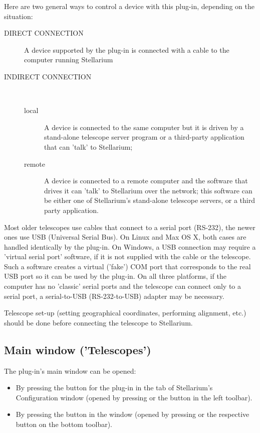 Here are two general ways to control a device with this plug-in, depending on the situation:
\begin{description}
\item[DIRECT CONNECTION] A device supported by the plug-in is
  connected with a cable to the computer running Stellarium

\item[INDIRECT CONNECTION]\mbox{\ } %
  \begin{description}
  \item[local] A device is connected to the same computer but it is
    driven by a stand-alone telescope server program or a third-party
    application that can 'talk' to Stellarium;

  \item[remote] A device is connected to a remote computer and the
    software that drives it can 'talk' to Stellarium over the network;
    this software can be either one of Stellarium's stand-alone
    telescope servers, or a third party application.
  \end{description}
\end{description}
Most older telescopes use cables that connect to a serial port
(RS-232), the newer ones use USB (Universal Serial Bus). On Linux and
Max OS X, both cases are handled identically by the plug-in. On
Windows, a USB connection may require a 'virtual serial port'
software, if it is not supplied with the cable or the telescope. Such
a software creates a virtual ('fake') COM port that corresponds to the
real USB port so it can be used by the plug-in. On all three
platforms, if the computer has no 'classic' serial ports and the
telescope can connect only to a serial port, a serial-to-USB
(RS-232-to-USB) adapter may be necessary.

Telescope set-up (setting geographical coordinates, performing
alignment, etc.) should be done before connecting the telescope to
Stellarium.

\subsection{Main window ('Telescopes')}

The plug-in's main window can be opened:
\begin{itemize}
\item By pressing the  button for the plug-in in the
   tab of Stellarium's Configuration window (opened by
  pressing  or the  button in the left toolbar).
\item By pressing the  button in the 
  window (opened by pressing  or the respective button on the
  bottom toolbar).
\end{itemize}

